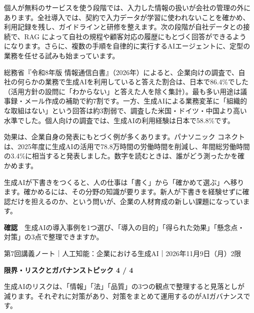 \documentclass[paper=a4paper,fontsize=10pt,line_length=170mm,number_of_lines=46,baselineskip=1.6zw]{jlreq}
\newcommand\topichead[4]{%
  {\sffamily\footnotesize\color{grayt}#1\par}\vspace{1.5mm}
  {\sffamily\bfseries\LARGE #4}\hfill\colorbox{accent}{\sffamily\footnotesize\bfseries トピック #2 / #3}\par
  \vspace{1.2mm}{\color{ink}\hrule height 0.6pt}\vspace{3mm}}
\newcommand\subhead[1]{\par\vspace{2.6mm}{\sffamily\bfseries\large #1}\par\vspace{1.3mm}}
\begin{document}
\subhead{個人利用から全社導入へ}
個人が無料のサービスを使う段階では、入力した情報の扱いが会社の管理の外にあります。全社導入では、契約で入力データが学習に使われないことを確かめ、利用記録を残し、ガイドラインと研修を整えます。次の段階が自社データとの接続で、RAG によって自社の規程や顧客対応の履歴にもとづく回答ができるようになります。さらに、複数の手順を自律的に実行するAIエージェントに、定型の業務を任せる試みも始まっています。\par\vspace{1.2mm}
\subhead{利用の広がりと効果}
総務省『令和8年版 情報通信白書』（2026年）によると、企業向けの調査で、自社の何らかの業務で生成AIを利用していると答えた割合は、日本で86.4\%でした（活用方針の設問に「わからない」と答えた人を除く集計）。最も多い用途は議事録・メール作成の補助で約7割です。一方、生成AIによる業務変革に「組織的な取組はない」という回答は約3割弱で、調査した米国・ドイツ・中国より高い水準でした。個人向けの調査では、生成AIの利用経験は日本で58.8\%です。\par\vspace{1.2mm}
効果は、企業自身の発表にもとづく例が多くあります。パナソニック コネクトは、2025年度に生成AIの活用で78.8万時間の労働時間を削減し、年間総労働時間の3.4\%に相当すると発表しました。数字を読むときは、誰がどう測ったかを確かめます。\par\vspace{1.2mm}
\subhead{仕事の中身の変化}
生成AIが下書きをつくると、人の仕事は「書く」から「確かめて選ぶ」へ移ります。確かめるには、その分野の知識が要ります。新人が下書きを経験せずに確認だけを担えるのか、という問いが、企業の人材育成の新しい課題になっています。\par\vspace{1.2mm}
\begin{checkbox}
{\sffamily\bfseries 確認}　生成AIの導入事例を1つ選び、「導入の目的」「得られた効果」「懸念点・対策」の3点で整理できますか。\par
\end{checkbox}
\clearpage
\topichead{第7回講義ノート｜人工知能：企業における生成AI｜2026年11月9日（月）2限}{4}{4}{限界・リスクとガバナンス}
生成AIのリスクは、「情報」「法」「品質」の3つの観点で整理すると見落としが減ります。それぞれに対策があり、対策をまとめて運用するのがAIガバナンスです。\par\vspace{1.2mm}
\end{document}
